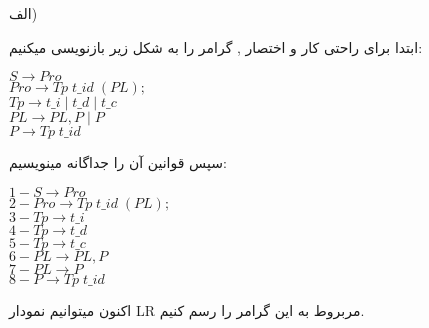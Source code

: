 

الف)

ابتدا برای راحتی کار و اختصار , گرامر را به شکل زیر بازنویسی میکنیم:


\begin{center}
\begin{latin}
$S \rightarrow Pro$
\\
$Pro \rightarrow Tp \; t\_id \; (PL);$
\\
$Tp \rightarrow t\_i \; | \; t\_d \; | \;  t\_c$
\\
$PL \rightarrow PL,P \;  | \; P$
\\
$P \rightarrow Tp \; t\_id$
\end{latin}
\end{center}

سپس قوانین آن را جداگانه مینویسیم:

\begin{flushleft}
\begin{latin}
$1 -  S \rightarrow Pro$
\\
$2 -  Pro \rightarrow Tp \; t\_id \; (PL);$
\\
$3 -  Tp \rightarrow t\_i $
\\
$4 -  Tp \rightarrow t\_d $
\\
$5 -  Tp \rightarrow t\_c $
\\
$6 -  PL \rightarrow PL,P$
\\
$7 -  PL \rightarrow P$
\\
$8 -  P \rightarrow Tp \; t\_id$
\\
\end{latin}
\end{flushleft}

اکنون میتوانیم نمودار LR مربروط به این گرامر را رسم کنیم.


